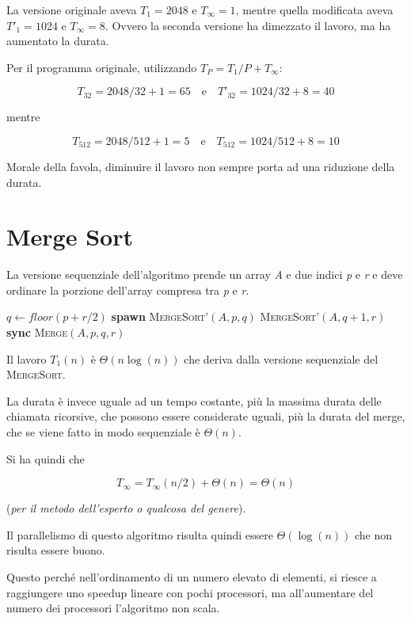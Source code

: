La versione originale aveva $T_1 = 2048$ e $T_\infty = 1$, mentre quella modificata aveva $T'_1 = 1024$ e $T_\infty = 8$. Ovvero la seconda versione ha dimezzato il lavoro, ma ha aumentato la durata.

Per il programma originale, utilizzando $T_P = T_1/P + T_\infty$:

$$T_{32} = 2048/32 +1 = 65 \quad \text{e} \quad T'_{32} = 1024/32 +8 = 40$$

mentre

$$T_{512} = 2048/512 + 1 = 5 \quad \text{e} \quad  T_{512} = 1024/512 + 8 = 10$$

Morale della favola, diminuire il lavoro non sempre porta ad una riduzione della durata.

\section{Merge Sort}\label{merge-sort}

La versione sequenziale dell'algoritmo prende un array \emph{A} e due indici \emph{p} e \emph{r} e deve ordinare la porzione dell'array compresa tra \emph{p} e \emph{r}.

\begin{breakablealgorithm}
	\begin{algorithmic}[1]
    \State $q \gets floor(p+r/2)$
    \State \textbf{spawn } \textsc{MergeSort'}$(A,p,q)$
    \State \textsc{MergeSort'}$(A,q+1,r)$
    \State \textbf{sync}
    \State \textsc{Merge}$(A,p,q,r)$
\EndIf
\EndFunction
	\end{algorithmic}
\end{breakablealgorithm}

Il lavoro $T_1(n)$ è $\Theta(n \log(n))$ che deriva dalla versione sequenziale del \textsc{MergeSort}.

La durata è invece uguale ad un tempo costante, più la massima durata delle chiamata ricorsive, che possono essere considerate uguali, più la durata del merge, che se viene fatto in modo sequenziale è $\Theta(n)$. 

Si ha quindi che 

$$T_\infty = T_\infty(n/2) + \Theta(n) = \Theta(n)$$ 

(\emph{per il metodo dell'esperto o qualcosa del genere}).

Il parallelismo di questo algoritmo risulta quindi essere $\Theta(\log(n))$ che non risulta essere buono.

Questo perché nell'ordinamento di un numero elevato di elementi, si riesce a raggiungere uno speedup lineare con pochi processori, ma all'aumentare del numero dei processori l'algoritmo non scala.

